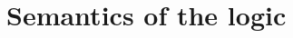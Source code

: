 \documentclass[12pt,a4paper]{report}
\begin{document}
%



\section{Semantics of the logic}
\end{document}
